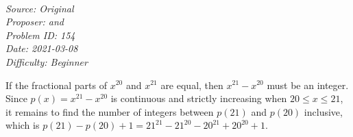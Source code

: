 \SSbreak\\
\emph{Source: Original}\\
\emph{Proposer: \Ptan and \Pwen}\\
\emph{Problem ID: 154}\\
\emph{Date: 2021-03-08}\\
\emph{Difficulty: Beginner}\\
\SSbreak

\bigskip

\begin{solution}\hfil\medskip
  
    If the fractional parts of $x^{20}$ and $x^{21}$ are equal, then $x^{21} - x^{20}$ must be an integer. Since $p(x) = x^{21} - x^{20}$ is continuous and
    strictly increasing when $20 \leq x \leq 21$, it remains to find the number of integers between $p(21)$ and $p(20)$ inclusive, 
    which is $p(21) - p(20) + 1 = \boxed{21^{21} - 21^{20} - 20^{21} + 20^{20} + 1}$.
\end{solution}\bigskip
